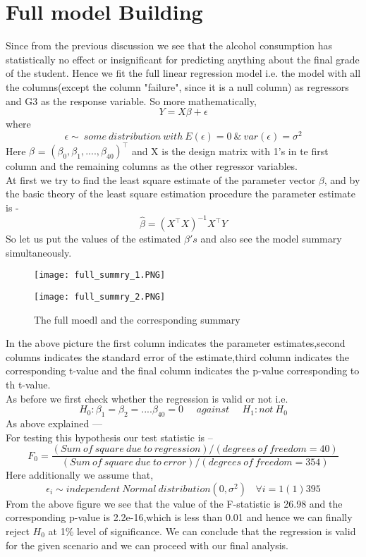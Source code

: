 \documentclass[A4paper,11pt]{report}
\begin{document}
	 \section{Full model Building}
	 Since from the previous discussion we see that the alcohol consumption has statistically no effect or insignificant for predicting anything about the final grade of the student. Hence we fit the full linear regression model i.e. the model with all the columns(except the column "failure", since it is a null column) as regressors and G3 as the response variable. So more mathematically,
	 $$Y = X\beta + \epsilon $$
	 where
	 \begin{equation}
	 	\epsilon \sim\ some\ distribution\ with\ E(\epsilon) = 0\ \&\ var(\epsilon) = \sigma^2
	 \end{equation}
	 Here $\beta$ = $(\beta_0,\beta_1,....,\beta_{40})^\intercal$ and X is the design matrix with 1's in te first column and the remaining columns as the other regressor variables.\\
	 At first we try to find the least square estimate of the parameter vector $\beta$, and by the basic theory of the least square estimation procedure the parameter estimate is - 
	 $$\hat{ \beta} = (X^\intercal X)^{-1}X^\intercal Y$$  
	 So let us put the values of the estimated $\beta's$ and also see the model summary simultaneously.
	 \begin{figure}[H]
	 	\texttt{[image: full\_summry\_1.PNG]}
	 \end{figure}
	 \begin{figure}[H]
	 	\texttt{[image: full\_summry\_2.PNG]}
	 	\caption{The full moedl and the corresponding summary}
	 \end{figure}
	 In the above picture the first column indicates the parameter estimates,second columns indicates the standard error of the estimate,third column indicates the corresponding t-value and the final column indicates the p-value corresponding to th t-value.\\
	 As before we first check whether the regression is valid or not i.e.
	 $$H_0 : \beta_1 = \beta_2 =.... \beta_{40} = 0\ \ \ \ \ \  against \ \ \ \ \ \ H_1 : not\ H_0$$
	 As above explained ---\\
	 For testing this hypothesis our test statistic is --\\
	 $$F_0 = \frac{(Sum\ of\ square\ due\ to\ regression)/(degrees\ of\ freedom = 40)}{(Sum\ of\ square\ due\ to\ error)/(degrees\ of\ freedom = 354)}$$
	 Here additionally we assume that,$$\epsilon_i \sim independent\ Normal\ distribution(0,\sigma^2)\ \ \ \ \forall i= 1(1)395$$
	 From the above figure we see that the value of the F-statistic is 26.98 and the corresponding p-value is 2.2e-16,which is less than 0.01 and hence we can finally  reject $H_0$ at 1\% level of significance. We can conclude that the regression is valid for the given scenario and we can proceed with our final analysis.
\end{document}
